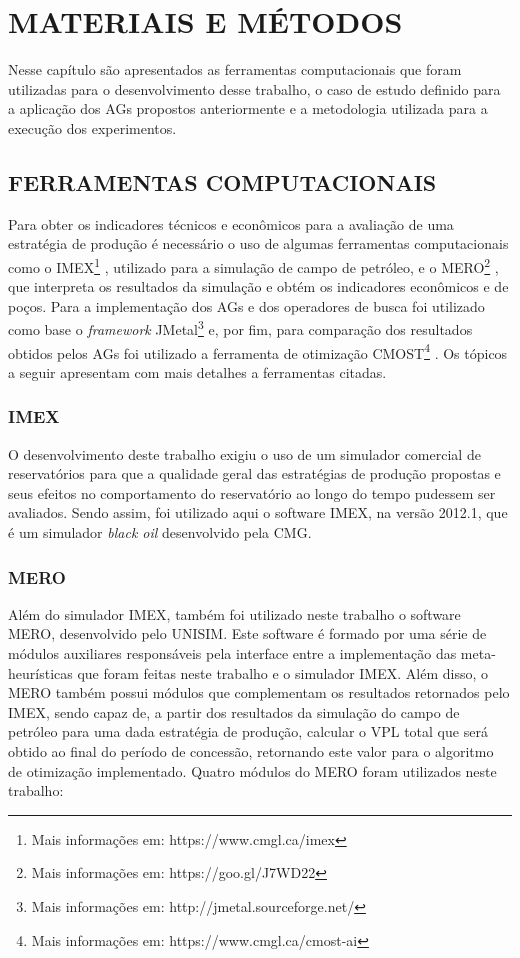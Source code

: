 \chapter{MATERIAIS E MÉTODOS}

Nesse capítulo são apresentados as ferramentas computacionais que foram utilizadas para o desenvolvimento desse trabalho, o caso de estudo definido para a aplicação dos AGs propostos anteriormente e a metodologia utilizada para a execução dos experimentos. 

\section{FERRAMENTAS COMPUTACIONAIS}

Para obter os indicadores técnicos e econômicos para a avaliação de uma estratégia de produção é necessário o uso de algumas ferramentas computacionais como o IMEX\footnote{Mais informações em: https://www.cmgl.ca/imex} , utilizado para a simulação de campo de petróleo, e o MERO\footnote{Mais informações em: https://goo.gl/J7WD22} , que interpreta os resultados da simulação e obtém os indicadores econômicos e de poços. Para a implementação dos AGs e dos operadores de busca foi utilizado como base o \textit{framework} JMetal\footnote{Mais informações em: http://jmetal.sourceforge.net/}  e, por fim, para comparação dos resultados obtidos pelos AGs foi utilizado a ferramenta de otimização CMOST\footnote{Mais informações em: https://www.cmgl.ca/cmost-ai} . Os tópicos a seguir apresentam com mais detalhes a ferramentas citadas.

\subsection{IMEX}

O desenvolvimento deste trabalho exigiu o uso de um simulador comercial de reservatórios para que a qualidade geral das estratégias de produção propostas e seus efeitos no comportamento do reservatório ao longo do tempo pudessem ser avaliados. Sendo assim, foi utilizado aqui o software IMEX, na versão 2012.1, que é um simulador \textit{black oil} desenvolvido pela CMG. 

\subsection{MERO}

Além do simulador IMEX, também foi utilizado neste trabalho o software MERO, desenvolvido pelo UNISIM. Este software é formado por uma série de módulos auxiliares responsáveis pela interface entre a implementação das meta-heurísticas que foram feitas neste trabalho e o simulador IMEX. Além disso, o MERO também possui módulos que complementam os resultados retornados pelo IMEX, sendo capaz de, a partir dos resultados da simulação do campo de petróleo para uma dada estratégia de produção, calcular o VPL total que será obtido ao final do período de concessão, retornando este valor para o algoritmo de otimização implementado. Quatro módulos do MERO foram utilizados neste trabalho:

